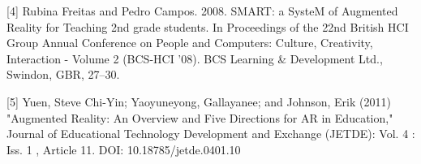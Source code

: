 \documentclass{vgtc}                          %
\begin{document}
[4] Rubina Freitas and Pedro Campos. 2008. SMART: a SysteM of Augmented Reality for Teaching 2nd grade students. In Proceedings of the 22nd British HCI Group Annual Conference on People and Computers: Culture, Creativity, Interaction - Volume 2 (BCS-HCI '08). BCS Learning & Development Ltd., Swindon, GBR, 27–30.

[5] Yuen, Steve Chi-Yin; Yaoyuneyong, Gallayanee; and Johnson, Erik (2011) "Augmented Reality: An Overview and Five Directions for AR in Education," Journal of Educational Technology Development and Exchange (JETDE): Vol. 4 : Iss. 1 , Article 11.
DOI: 10.18785/jetde.0401.10
\end{document}
